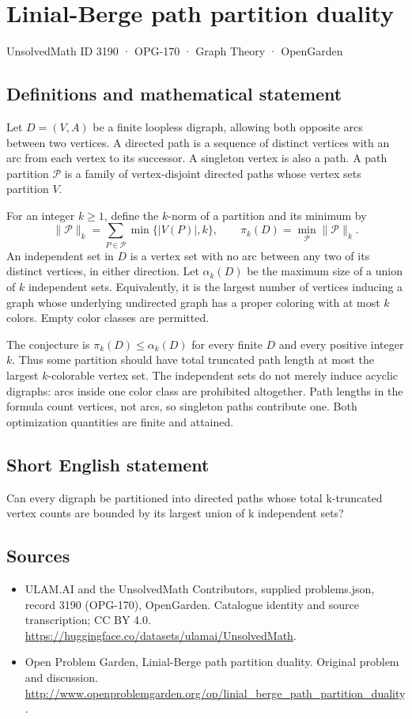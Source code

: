 \documentclass[11pt,a4paper]{article}
\begin{document}
\section*{Linial-Berge path partition duality}\label{3190}
{\small UnsolvedMath ID 3190 · OPG-170 · Graph Theory · OpenGarden}
\subsection{Definitions and mathematical statement}
Let $D=(V,A)$ be a finite loopless digraph, allowing both opposite arcs between two vertices. A directed path is a sequence of distinct vertices with an arc from each vertex to its successor. A singleton vertex is also a path. A path partition $\mathcal P$ is a family of vertex-disjoint directed paths whose vertex sets partition $V$.

For an integer $k\ge1$, define the $k$-norm of a partition and its minimum by
\[
 \|\mathcal P\|_k=\sum_{P\in\mathcal P}\min\{|V(P)|,k\},
 \qquad \pi_k(D)=\min_{\mathcal P}\|\mathcal P\|_k.
\]
An independent set in $D$ is a vertex set with no arc between any two of its distinct vertices, in either direction. Let $\alpha_k(D)$ be the maximum size of a union of $k$ independent sets. Equivalently, it is the largest number of vertices inducing a graph whose underlying undirected graph has a proper coloring with at most $k$ colors. Empty color classes are permitted.

The conjecture is $\pi_k(D)\le\alpha_k(D)$ for every finite $D$ and every positive integer $k$. Thus some partition should have total truncated path length at most the largest $k$-colorable vertex set. The independent sets do not merely induce acyclic digraphs: arcs inside one color class are prohibited altogether. Path lengths in the formula count vertices, not arcs, so singleton paths contribute one. Both optimization quantities are finite and attained.
\subsection{Short English statement}
Can every digraph be partitioned into directed paths whose total k-truncated vertex counts are bounded by its largest union of k independent sets?
\subsection{Sources}
\begin{itemize}
\item[S1] ULAM.AI and the UnsolvedMath Contributors, supplied problems.json, record 3190 (OPG-170), OpenGarden. Catalogue identity and source transcription; CC BY 4.0.
\url{https://huggingface.co/datasets/ulamai/UnsolvedMath}.
\item[S2] Open Problem Garden, Linial-Berge path partition duality. Original problem and discussion.
\url{http://www.openproblemgarden.org/op/linial_berge_path_partition_duality}.
\end{itemize}
\end{document}
